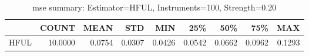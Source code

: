 \begin{table}[ht]
\centering
\caption{mse summary: Estimator=HFUL, Instruments=100, Strength=0.20}
\begin{tabular}{lrrrrrrrr}
\toprule
 & COUNT & MEAN & STD & MIN & 25\% & 50\% & 75\% & MAX \\
\midrule
HFUL & 10.0000 & 0.0754 & 0.0307 & 0.0426 & 0.0542 & 0.0662 & 0.0962 & 0.1293 \\
\bottomrule
\end{tabular}
\end{table}
